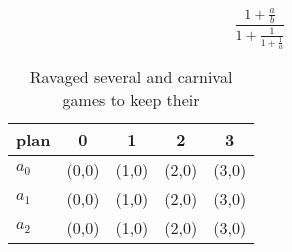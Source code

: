 \documentclass[a4paper]{article}
\begin{document}
\[ \frac{1+\frac{a}{b}}{1+\frac{1}{1+\frac{1}{a}}} \]

\begin{table}
\begin{adjustbox}{width=0.6\columnwidth}
\begin{tabular}{|l|l|l|l|l|}
\hline
\textbf{plan} & \multicolumn{1}{c|}{\textbf{0}} & \multicolumn{1}{c|}{\textbf{1}} & \multicolumn{1}{c|}{\textbf{2}} & \multicolumn{1}{c|}{\textbf{3}} \\ \hline
\textbf{$a_0$}  & (0,0) & (1,0) & (2,0) & (3,0) \\ \hline
\textbf{$a_1$}  & (0,0) & (1,0) & (2,0) & (3,0) \\ \hline
\textbf{$a_2$}  & (0,0) & (1,0) & (2,0) & (3,0) \\ \hline
\end{tabular}
\end{adjustbox}
\caption{Ravaged several and carnival games to keep their 
}
\end{table}
\end{document}
